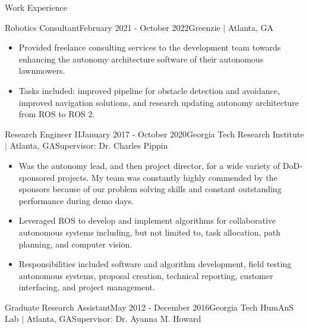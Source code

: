 \documentclass{resume} %
\begin{document}
\begin{rSection}{Work Experience}
\begin{rSubsection}{Robotics Consultant}{February 2021 - October 2022}{Greenzie $\vert$ Atlanta, GA}{}

\item
\begin{itemize}
\item Provided freelance consulting services to the development team towards
  enhancing the autonomy architecture software of their autonomous lawnmowers.

\item Tasks included: improved pipeline for obstacle detection and avoidance,
  improved navigation solutions, and research updating autonomy architecture
  from ROS to ROS 2.
\end{itemize}

\end{rSubsection}


\begin{rSubsection}{Research Engineer II}{January 2017 - October 2020}{Georgia Tech Research Institute $\vert$ Atlanta, GA}{Supervisor: Dr. Charles Pippin}

\item
\begin{itemize}
\item Was the autonomy lead, and then project director, for a wide variety of
  DoD-sponsored projects. My team was constantly highly commended by the
  sponsors because of our problem solving skills and constant outstanding
  performance during demo days.

\item Leveraged ROS to develop and implement algorithms for collaborative
  autonomous systems including, but not limited to, task allocation, path
  planning, and computer vision.

\item Responsibilities included software and algorithm development, field
  testing autonomous systems, proposal creation, technical reporting, customer
  interfacing, and project management.

\end{itemize}

\end{rSubsection}


\begin{rSubsection}{Graduate Research Assistant}{May 2012 - December 2016}{Georgia Tech HumAnS Lab $\vert$ Atlanta, GA}{Supervisor: Dr. Ayanna M. Howard}


\end{rSubsection}
\end{rSection}
\end{document}

